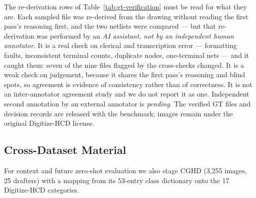 The re-derivation rows of Table~\ref{tab:gt-verification} must be read
for what they are. Each sampled file was re-derived from the drawing
without reading the first pass's reasoning first, and the two netlists
were compared --- but that re-derivation was performed by an \emph{AI
assistant, not by an independent human annotator}. It is a real check on
clerical and transcription error --- formatting faults, inconsistent
terminal counts, duplicate nodes, one-terminal nets --- and it caught
them: seven of the nine files flagged by the cross-checks changed. It is
a weak check on judgement, because it shares the first pass's reasoning
and blind spots, so agreement is evidence of consistency rather than of
correctness. It is not an inter-annotator agreement study and we do not
report it as one. Independent second annotation by an external annotator
is \emph{pending}.
The verified GT files and decision records are released with the
benchmark; images remain under the original Digitize-HCD license.

\begin{table}[t]
  \centering
  \caption{Split composition. Connectivity ground truth exists for both
  evaluation splits; the training split carries only the published box
  annotations.}
  \label{tab:splits}
  
\end{table}

\begin{table}[t]
  \centering
  \caption{Judgement recorded while building the test-split ground truth.
  Every count is derived from the released per-image decision records by
  \texttt{scripts/gt\_verification\_stats.py}. The lower block reports an
  \emph{automated self-consistency re-derivation}: files re-derived from
  the drawing before reading the first pass, by an AI assistant and
  \emph{not} by an independent human annotator. It detects clerical and
  transcription error; it cannot establish that a judgement call is
  correct, because it shares the first pass's reasoning. Independent
  human second annotation is pending.}
  \label{tab:gt-verification}
  
\end{table}

\subsection{Cross-Dataset Material}
For context and future zero-shot evaluation we also stage CGHD
\cite{cghd} (3{,}255 images, 25 drafters) with a mapping from its
53-entry class dictionary onto the 17 Digitize-HCD categories.
